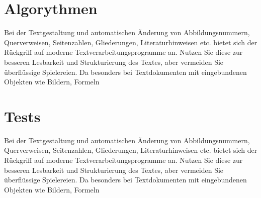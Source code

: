 \section{Algorythmen}
Bei der Textgestaltung und automatischen Änderung von Abbildungsnummern, Querverweisen,
Seitenzahlen, Gliederungen, Literaturhinweisen etc. bietet sich der Rückgriff
auf moderne Textverarbeitungsprogramme an. Nutzen Sie diese zur besseren Lesbarkeit
und Strukturierung des Textes, aber vermeiden Sie überflüssige Spielereien. Da
besonders bei Textdokumenten mit eingebundenen Objekten wie Bildern, Formeln

\section{Tests}
Bei der Textgestaltung und automatischen Änderung von Abbildungsnummern, Querverweisen,
Seitenzahlen, Gliederungen, Literaturhinweisen etc. bietet sich der Rückgriff
auf moderne Textverarbeitungsprogramme an. Nutzen Sie diese zur besseren Lesbarkeit
und Strukturierung des Textes, aber vermeiden Sie überflüssige Spielereien. Da
besonders bei Textdokumenten mit eingebundenen Objekten wie Bildern, Formeln
